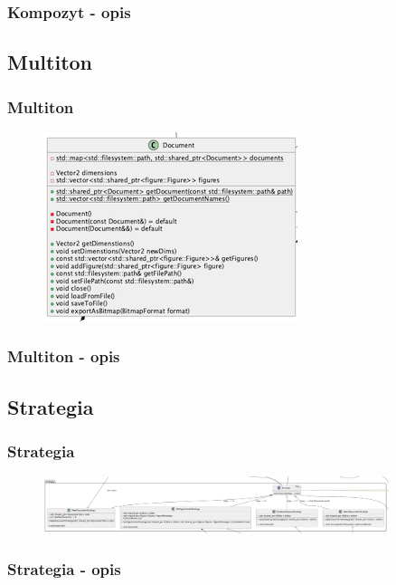\documentclass[
	11pt,]{beamer}
\begin{document}
\begin{frame}
	\frametitle{Kompozyt - opis}
	
\end{frame}

\subsection{Multiton}

\begin{frame}
	\frametitle{Multiton}
	
	\begin{figure}
		\includegraphics[height=0.7\textheight]{figures/multiton.png}
	\end{figure}
\end{frame}

\begin{frame}
	\frametitle{Multiton - opis}
	
\end{frame}

\subsection{Strategia}

\begin{frame}
	\frametitle{Strategia}
	
	\begin{figure}
		\includegraphics[width=0.9\textwidth]{figures/strategy.png}
	\end{figure}
\end{frame}

\begin{frame}
	\frametitle{Strategia - opis}
	
\end{frame}
\end{document}
